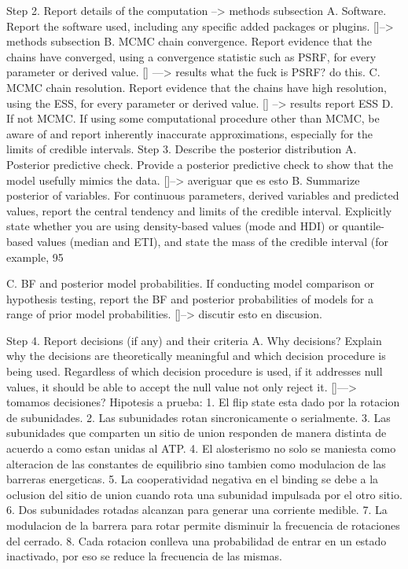 \documentclass[a4paper,12pt]{article}
\begin{document}
		Step 2. Report details of the computation --> methods subsection
		A. Software. Report the software used, including any specific added packages or plugins. []--> methods subsection
		B. MCMC chain convergence. Report evidence that the chains have converged, using a convergence statistic such as PSRF, for every parameter or derived value. [] --->  results  what the fuck is PSRF? do this. 
		C. MCMC chain resolution. Report evidence that the chains have high resolution, using the ESS, for every parameter or derived value. [] --> results report ESS
		D. If not MCMC. If using some computational procedure other than MCMC, be aware of and report inherently inaccurate approximations, especially for the limits of credible intervals.
		Step 3. Describe the posterior distribution
		A. Posterior predictive check. Provide a posterior predictive check to show that the model usefully mimics the data. []--> averiguar que es esto 
		B. Summarize posterior of variables. For continuous parameters, derived variables and predicted values, report the central tendency and limits of the credible interval. Explicitly state whether you are using density-based values (mode and HDI) or quantile-based values (median and ETI), and state the mass of the credible interval (for example, 95%
		
		C. BF and posterior model probabilities. If conducting model comparison or hypothesis testing, report the BF and posterior probabilities of models for a range of prior model probabilities.
		[]--> discutir esto en discusion. 
		
		Step 4. Report decisions (if any) and their criteria
		A. Why decisions? Explain why the decisions are theoretically meaningful and which decision procedure is being used. Regardless of which decision procedure is used, if it addresses null values, it should be able to accept the null value not only reject it.
		[]---> tomamos decisiones? Hipotesis a prueba: 
		1. El flip state esta dado por la rotacion de subunidades. 
		2. Las subunidades rotan sincronicamente o serialmente. 
		3. Las subunidades que comparten un sitio de union responden de manera distinta de acuerdo a como estan unidas al ATP. 
		4. El alosterismo no solo se maniesta como alteracion de las constantes de equilibrio sino tambien como modulacion de las barreras energeticas. 
		5. La cooperatividad negativa en el binding se debe a la oclusion del sitio de union cuando rota una subunidad impulsada por el otro sitio. 
		6. Dos subunidades rotadas alcanzan para generar una corriente medible. 
		7. La modulacion de la barrera para rotar permite disminuir la frecuencia de rotaciones del cerrado. 
		8. Cada rotacion conlleva una probabilidad de entrar en un estado inactivado, por eso se reduce la frecuencia de las mismas. 
		
\end{document}
